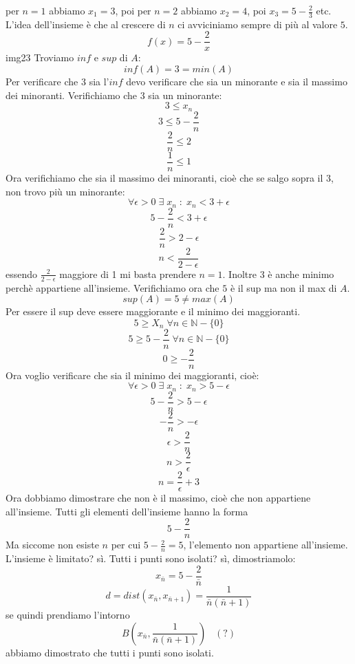 per $n=1$ abbiamo $x_1 =3$, poi per $n=2$ abbiamo $x_2=4$, poi $x_3 = 5-\frac{2}{3}$ etc.
\newline
L'idea dell'insieme è che al crescere di $n$ ci avviciniamo sempre di più al valore $5$.
\newline
\[
    f(x) = 5-\frac{2}{x}
\] 
img23
\newline
Troviamo $inf$ e $sup$ di $A$:
\[
    inf(A)=3 = min(A)
\]
Per verificare che $3$ sia l'$inf$ devo verificare che sia un minorante e sia il massimo dei minoranti.
\newline
Verifichiamo che $3$ sia un minorante:
\[
    3 \leq x_n
\]
\[
    3 \leq 5 - \frac{2}{n}    
\]
\[
    \frac{2}{n} \leq 2
\]
\[
    \frac{1}{n} \leq 1
\]
Ora verifichiamo che sia il massimo dei minoranti, cioè che se salgo sopra il $3$, non trovo più un minorante:
\[
    \forall \epsilon > 0 \;\exists\; x_n \;:\; x_n < 3+\epsilon
\]
\[
    5-\frac{2}{n} < 3 +\epsilon    
\]
\[
    \frac{2}{n} > 2 -\epsilon
\]
\[
    n < \frac{2}{2-\epsilon}
\]
essendo $\frac{2}{2-\epsilon}$ maggiore di 1 mi basta prendere $n=1$.
\newline
Inoltre $3$ è anche minimo perchè appartiene all'insieme.
\newline
Verifichiamo ora che $5$ è il sup ma non il max di $A$.
\[
    sup(A)=5 \neq max(A)
\]
Per essere il sup deve essere maggiorante e il minimo dei maggioranti.
\[
    5 \geq X_n \;  \forall n \in \mathbb{N}-\{0\}
\]
\[
    5\geq 5 - \frac{2}{n} \;  \forall n \in \mathbb{N}-\{0\}
\]
\[
    0\geq -\frac{2}{n}
\]
Ora voglio verificare che sia il minimo dei maggioranti, cioè:
\[
        \forall \epsilon>0 \;\exists\; x_n \;:\; x_n > 5-\epsilon
\]
\[
    5-\frac{2}{n}> 5-\epsilon
\]
\[
    -\frac{2}{n}> -\epsilon
\]
\[
    \epsilon > \frac{2}{n}
\]
\[
    n > \frac{2}{\epsilon}
\]
\[
    n = \frac{2}{\epsilon} +3
\]
Ora dobbiamo dimostrare che non è il massimo, cioè che non appartiene all'insieme.
\newline
Tutti gli elementi dell'insieme hanno la forma 
\[
    5-\frac{2}{n}
\]
Ma siccome non esiste $n$ per cui $5-\frac{2}{n} = 5$, l'elemento non appartiene all'insieme.
\newline
L'insieme è limitato? sì.
\newline
Tutti i punti sono isolati? sì, dimostriamolo:
\[
    x_{\bar{n}} = 5 - \frac{2}{\bar{n}}
\]
\[
    d = dist(x_{\bar{n}}, x_{\bar{n}+1}) = \frac{1}{\bar{n}(\bar{n}+1)}
\]
se quindi prendiamo l'intorno
\[
    B(x_{\bar{n}},\frac{1}{\bar{n}(\bar{n}+1)}) \;\;\;(?)
\]
abbiamo dimostrato che tutti i punti sono isolati.

